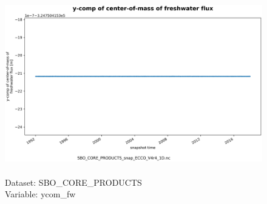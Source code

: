 \begin{figure}[H]
\centering
\includegraphics[scale=0.5]{../images/plots/oneD_plots/SBO_Core_Products/ycom_fw.png}
\caption{\\Dataset: SBO\_CORE\_PRODUCTS\\Variable: ycom\_fw}
\label{tab:table-SBO_CORE_PRODUCTS_ycom_fw-Plot}
\end{figure}
\pagebreak

